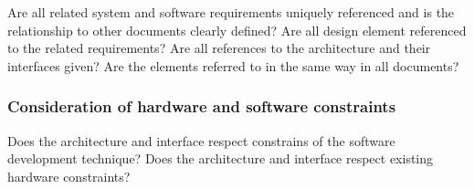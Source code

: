 \documentclass{article}
\begin{document}
Are all related system and software requirements uniquely referenced and is the relationship to other documents clearly defined? 
Are all design element referenced to the related requirements? Are all references to the architecture and their interfaces given?
Are the elements referred to in the same way in all documents?

\subsubsection{Consideration of hardware and software constraints}

Does the architecture and interface respect constrains of the software development technique?
Does the architecture and interface respect existing hardware constraints?
\end{document}
